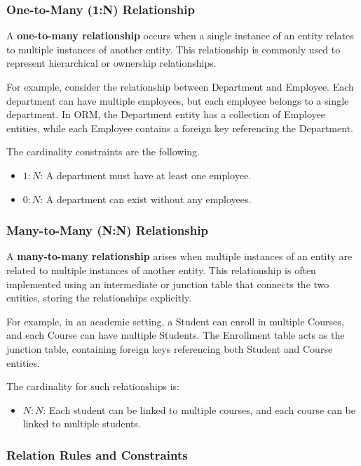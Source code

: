 \subsubsection{One-to-Many (1:N) Relationship} A \textbf{one-to-many relationship} occurs when a single instance of an entity relates to multiple instances of another entity. This relationship is commonly used to represent hierarchical or ownership relationships.

For example, consider the relationship between {Department} and {Employee}. Each department can have multiple employees, but each employee belongs to a single department. In ORM, the {Department} entity has a collection of {Employee} entities, while each {Employee} contains a foreign key referencing the {Department}.

The cardinality constraints are the following.
\begin{itemize}
    \item \(1:N\): A department must have at least one employee.
    \item \(0:N\): A department can exist without any employees.
\end{itemize}

\subsubsection{Many-to-Many (N:N) Relationship} A \textbf{many-to-many relationship} arises when multiple instances of an entity are related to multiple instances of another entity. This relationship is often implemented using an intermediate or junction table that connects the two entities, storing the relationships explicitly.

For example, in an academic setting, a {Student} can enroll in multiple {Courses}, and each {Course} can have multiple {Students}. The {Enrollment} table acts as the junction table, containing foreign keys referencing both {Student} and {Course} entities.

The cardinality for such relationships is:
\begin{itemize}
    \item \(N:N\): Each student can be linked to multiple courses, and each course can be linked to multiple students.
\end{itemize}

\subsubsection{Relation Rules and Constraints}

